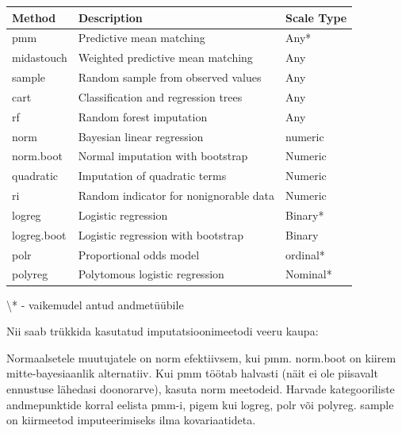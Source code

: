 \documentclass[]{book}
\newenvironment{Shaded}{\begin{snugshade}}{\end{snugshade}}
\newcommand{\CommentTok}[1]{\textcolor[rgb]{0.56,0.35,0.01}{\textit{#1}}}
\newcommand{\DataTypeTok}[1]{\textcolor[rgb]{0.13,0.29,0.53}{#1}}
\newcommand{\DecValTok}[1]{\textcolor[rgb]{0.00,0.00,0.81}{#1}}
\newcommand{\KeywordTok}[1]{\textcolor[rgb]{0.13,0.29,0.53}{\textbf{#1}}}
\newcommand{\NormalTok}[1]{#1}
\newcommand{\OperatorTok}[1]{\textcolor[rgb]{0.81,0.36,0.00}{\textbf{#1}}}
\newcommand{\StringTok}[1]{\textcolor[rgb]{0.31,0.60,0.02}{#1}}
\begin{document}
\begin{tabular}{l|l|l}
\hline
Method & Description & Scale Type\\
\hline
pmm & Predictive mean matching & Any*\\
\hline
midastouch & Weighted predictive mean matching & Any\\
\hline
sample & Random sample from observed values & Any\\
\hline
cart & Classification and regression trees & Any\\
\hline
rf & Random forest imputation & Any\\
\hline
norm & Bayesian linear regression & numeric\\
\hline
norm.boot & Normal imputation with bootstrap & Numeric\\
\hline
quadratic & Imputation of quadratic terms & Numeric\\
\hline
ri & Random indicator for nonignorable data & Numeric\\
\hline
logreg & Logistic regression & Binary*\\
\hline
logreg.boot & Logistic regression with bootstrap & Binary\\
\hline
polr & Proportional odds model & ordinal*\\
\hline
polyreg & Polytomous logistic regression & Nominal*\\
\hline
\end{tabular}

\textbackslash{}* - vaikemudel antud andmetüübile

Nii saab trükkida kasutatud imputatsioonimeetodi veeru kaupa:

\begin{Shaded}
\end{Shaded}

Normaalsetele muutujatele on norm efektiivsem, kui pmm. norm.boot on kiirem mitte-bayesiaanlik alternatiiv. Kui pmm töötab halvasti (näit ei ole piisavalt ennustuse lähedasi doonorarve), kasuta norm meetodeid. Harvade kategooriliste andmepunktide korral eelista pmm-i, pigem kui logreg, polr või polyreg. sample on kiirmeetod imputeerimiseks ilma kovariaatideta.
\end{document}
